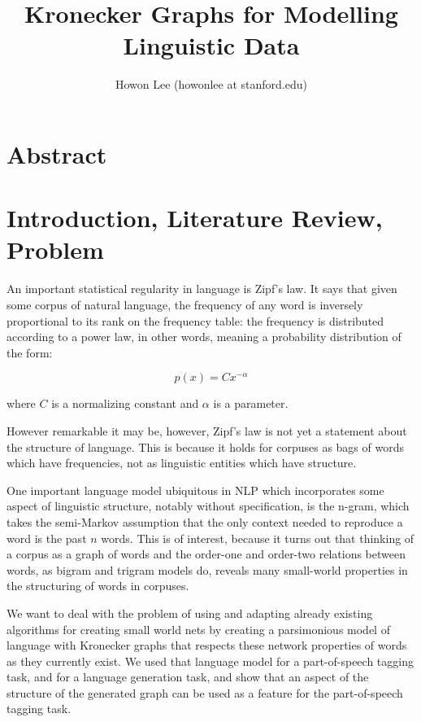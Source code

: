 \documentclass[12pt]{article}
\begin{document}
\title{Kronecker Graphs for Modelling Linguistic Data}
\author{Howon Lee (howonlee at stanford.edu)}
\maketitle


\section*{Abstract}


\section*{Introduction, Literature Review, Problem}

An important statistical regularity in language is Zipf's law. It says that given some corpus of natural language, the frequency of any word is inversely proportional to its rank on the frequency table: the frequency is distributed according to a power law, in other words, meaning a probability distribution of the form:

$$p(x) = Cx^{-\alpha} $$

where $C$ is a normalizing constant and $\alpha$ is a parameter.

However remarkable it may be, however, Zipf's law is not yet a statement about the structure of language. This is because it holds for corpuses as bags of words which have frequencies, not as linguistic entities which have structure. \cite{smallworldlang}

One important language model ubiquitous in NLP which incorporates some aspect of linguistic structure, notably without specification, is the n-gram, which takes the semi-Markov assumption that the only context needed to reproduce a word is the past $n$ words. This is of interest, because it turns out that thinking of a corpus as a graph of words and the order-one and order-two relations between words, as bigram and trigram models do, reveals many small-world properties in the structuring of words in corpuses.

We want to deal with the problem of using and adapting already existing algorithms for creating small world nets by creating a parsimonious model of language with Kronecker graphs that respects these network properties of words as they currently exist. We used that language model for a part-of-speech tagging task, and for a language generation task, and show that an aspect of the structure of the generated graph can be used as a feature for the part-of-speech tagging task.
\end{document}
